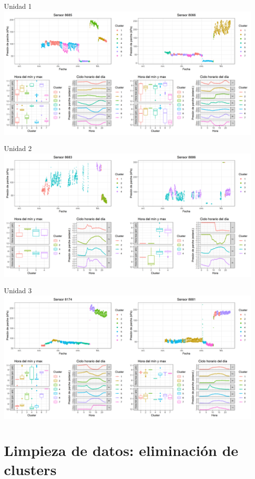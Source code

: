 \documentclass[
  letterpaper,
  DIV=11,
  numbers=noendperiod]{scrreprt}
\begin{document}
Unidad 1
\includegraphics{figuras/01_turgor_sensor/2023_2024_Rio_Claro_T4_Unidad_1.png}

Unidad 2
\includegraphics{figuras/01_turgor_sensor/2023_2024_Rio_Claro_T4_Unidad_2.png}

Unidad 3
\includegraphics{figuras/01_turgor_sensor/2023_2024_Rio_Claro_T4_Unidad_3.png}

\chapter{Limpieza de datos: eliminación de
clusters}\label{limpieza-de-datos-eliminaciuxf3n-de-clusters}
\end{document}
